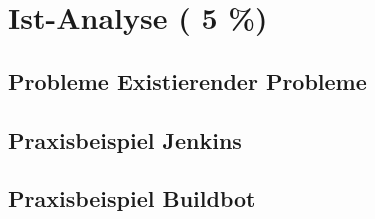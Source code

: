 \chapter{Ist-Analyse ( 5 \%)}
\section{Probleme Existierender Probleme}
\section{Praxisbeispiel Jenkins}
\section{Praxisbeispiel Buildbot}


